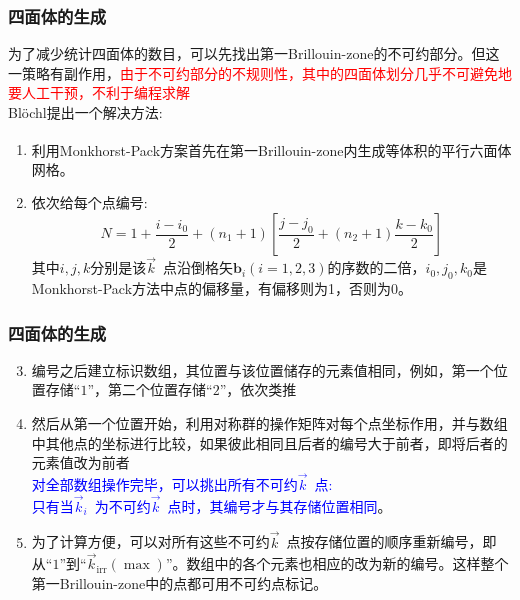 \documentclass[cjk,slidestop,compress,mathserif,blue]{beamer}
\newcommand{\upcite}[1]{\hspace{0ex}\textsuperscript{\cite{#1}}} %
\begin{document}
\frame
{
	\frametitle{四面体的生成}
	为了减少统计四面体的数目，可以先找出第一\textrm{Brillouin-zone}的不可约部分。但这一策略有副作用，\textcolor{red}{由于不可约部分的不规则性，其中的四面体划分几乎不可避免地要人工干预，不利于编程求解}\\\textrm{Bl\"ochl}提出一个解决方法:\\
\begin{enumerate}
	\item 利用\textrm{Monkhorst-Pack}方案\upcite{PRB13-5188_1976}首先在第一\textrm{Brillouin-zone}内生成等体积的平行六面体网格。
	\item 依次给每个点编号:
\begin{displaymath}
	\boxed{N=1+\dfrac{i-i_0}2+(n_1+1)\left[\dfrac{j-j_0}2+(n_2+1)\dfrac{k-k_0}2\right]}
\end{displaymath}
其中$i,j,k$分别是该$\vec k$~点沿倒格矢$\mathbf{b}_i(i=1,2,3)$的序数的二倍，$i_0,j_0,k_0$是\textrm{Monkhorst-Pack}方法中点的偏移量，有偏移则为1，否则为0。
\end{enumerate}
}

\frame
{
	\frametitle{四面体的生成}
\begin{enumerate}
	\setcounter{enumi}{2}
	\item 编号之后建立标识数组，其位置与该位置储存的元素值相同，例如，第一个位置存储“$1$”，第二个位置存储“$2$”，依次类推
	\item 然后从第一个位置开始，利用对称群的操作矩阵对每个点坐标作用，并与数组中其他点的坐标进行比较，如果彼此相同且后者的编号大于前者，即将后者的元素值改为前者\\\textcolor{blue}{对全部数组操作完毕，可以挑出所有不可约$\vec k$~点:\\只有当$\vec k_i$~为不可约$\vec k$~点时，其编号才与其存储位置相同}。
	\item 为了计算方便，可以对所有这些不可约$\vec k$~点按存储位置的顺序重新编号，即从“$1$”到“$\vec k_{\mathrm{irr}}(\max)$”。数组中的各个元素也相应的改为新的编号。这样整个第一\textrm{Brillouin-zone}中的点都可用不可约点标记。
\end{enumerate}
}
\end{document}
